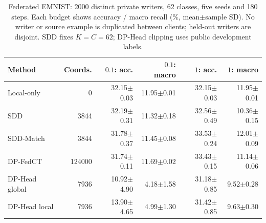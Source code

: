 \begin{table}[t]
\caption{Federated EMNIST: 2000 distinct private writers, 62 classes, five seeds and 180 steps. Each budget shows accuracy / macro recall (\%, mean$\pm$sample SD). No writer or source example is duplicated between clients; held-out writers are disjoint. SDD fixes $K=C=62$; DP-Head clipping uses public development labels.}
\label{tab:natural-main}\small
\centering
\begin{tabular}{@{}lrrrrr@{}}\toprule
Method & Coords. & $0.1$: acc. & $0.1$: macro & $1$: acc. & $1$: macro \\
\midrule
Local-only & 0 & 32.15$\pm$0.03 & 11.95$\pm$0.01 & 32.15$\pm$0.03 & 11.95$\pm$0.01 \\
SDD & 3844 & 32.19$\pm$0.31 & 11.32$\pm$0.18 & 32.56$\pm$0.49 & 10.36$\pm$0.15 \\
SDD-Match & 3844 & 31.78$\pm$0.37 & 11.45$\pm$0.08 & 33.53$\pm$0.24 & 12.01$\pm$0.09 \\
DP-FedCT & 124000 & 31.74$\pm$0.11 & 11.69$\pm$0.02 & 33.43$\pm$0.15 & 11.14$\pm$0.06 \\
DP-Head global & 7936 & 10.92$\pm$4.90 & 4.18$\pm$1.58 & 31.18$\pm$0.85 & 9.52$\pm$0.28 \\
DP-Head local & 7936 & 13.90$\pm$4.65 & 4.99$\pm$1.30 & 31.42$\pm$0.85 & 9.63$\pm$0.30 \\
\bottomrule\end{tabular}
\end{table}
